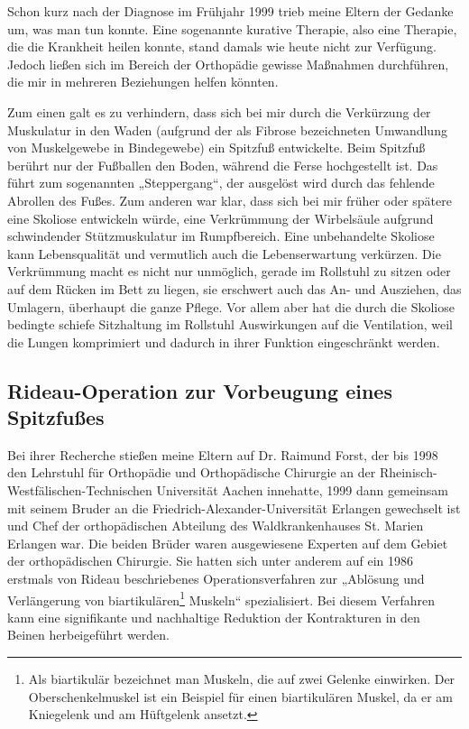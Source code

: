 \documentclass[fontsize=14pt,a4paper,headinclude,DIV=calc,automark]{scrbook}
\begin{document}
Schon kurz nach der Diagnose im Frühjahr 1999 trieb meine Eltern der Gedanke um, was man tun konnte. Eine sogenannte kurative Therapie, also eine Therapie, die die Krankheit heilen konnte, stand damals wie heute nicht zur Verfügung. Jedoch ließen sich im Bereich der Orthopädie gewisse Maßnahmen durchführen, die mir in mehreren Beziehungen helfen könnten.

Zum einen galt es zu verhindern, dass sich bei mir durch die Verkürzung der Muskulatur in den Waden (aufgrund der als Fibrose bezeichneten Umwandlung von Muskelgewebe in Bindegewebe) ein Spitzfuß entwickelte. Beim Spitzfuß berührt nur der Fußballen den Boden, während die Ferse hochgestellt ist. Das führt zum sogenannten „Steppergang“, der ausgelöst wird durch das fehlende Abrollen des Fußes.
Zum anderen war klar, dass sich bei mir früher oder spätere eine Skoliose entwickeln würde, eine Verkrümmung der Wirbelsäule aufgrund schwindender Stützmuskulatur im Rumpfbereich. Eine unbehandelte Skoliose kann Lebensqualität und vermutlich auch die Lebenserwartung verkürzen. Die Verkrümmung macht es nicht nur unmöglich, gerade im Rollstuhl zu sitzen oder auf dem Rücken im Bett zu liegen, sie erschwert auch das An- und Ausziehen, das Umlagern, überhaupt die ganze Pflege. Vor allem aber hat die durch die Skoliose bedingte schiefe Sitzhaltung im Rollstuhl Auswirkungen auf die Ventilation, weil die Lungen komprimiert und dadurch in ihrer Funktion eingeschränkt werden.

\subsection{Rideau-Operation zur Vorbeugung eines Spitzfußes}

Bei ihrer Recherche stießen meine Eltern auf Dr. Raimund Forst, der bis 1998 den Lehrstuhl für Orthopädie und Orthopädische Chirurgie an der Rheinisch-Westfälischen-Technischen Universität Aachen innehatte, 1999 dann gemeinsam mit seinem Bruder an die Friedrich-Alexander-Universität Erlangen gewechselt ist und Chef der orthopädischen Abteilung des Waldkrankenhauses St. Marien Erlangen war. Die beiden Brüder waren ausgewiesene Experten auf dem Gebiet der orthopädischen Chirurgie. Sie hatten sich unter anderem auf ein 1986 erstmals von Rideau beschriebenes Operationsverfahren zur „Ablösung und Verlängerung von biartikulären\footnote{Als biartikulär bezeichnet man Muskeln, die auf zwei Gelenke einwirken. Der Oberschenkelmuskel ist ein Beispiel für einen biartikulären Muskel, da er am Kniegelenk und am Hüftgelenk ansetzt.} Muskeln“ spezialisiert. Bei diesem Verfahren kann eine signifikante und nachhaltige Reduktion der Kontrakturen in den Beinen herbeigeführt werden.
\end{document}

